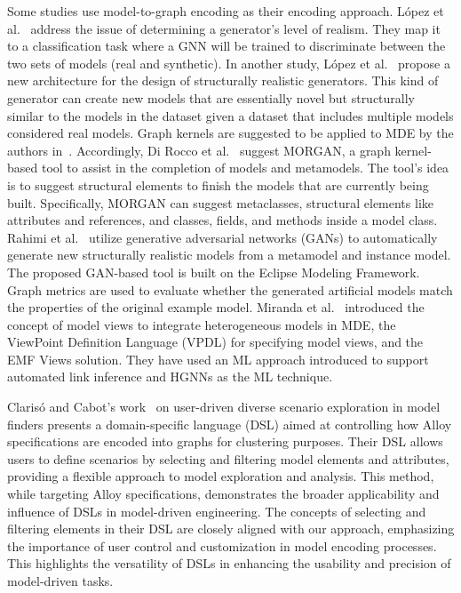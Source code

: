 \documentclass[journal,article,submit,moreauthors,technologies]{Definitions/mdpi}
\begin{document}
Some studies use model-to-graph encoding as their encoding approach. López et al.~\cite{lopez2021towards} address the issue of determining a generator's level of realism. They map it to a classification task where a GNN will be trained to discriminate between the two sets of models (real and synthetic). In another study, López et al.~\cite{lopez2022generating} propose a new architecture for the design of structurally realistic generators. This kind of generator can create new models that are essentially novel but structurally similar to the models in the dataset given a dataset that includes multiple models considered real models. Graph kernels are suggested to be applied to MDE by the authors in~\cite{clariso2018applying}. Accordingly, Di Rocco et al.~\cite{di2021gnn} suggest MORGAN, a graph kernel-based tool to assist in the completion of models and metamodels. The tool's idea is to suggest structural elements to finish the models that are currently being built. Specifically, MORGAN can suggest metaclasses, structural elements like attributes and references, and classes, fields, and methods inside a model class.
Rahimi et al.~\cite{rahimi2023towards} utilize generative adversarial networks (GANs) to automatically generate new structurally realistic models from a metamodel and instance model. The proposed GAN-based tool is built on the Eclipse Modeling Framework. Graph metrics are used to evaluate whether the generated artificial models match the properties of the original example model.
Miranda et al.~\cite{miranda2024towards} introduced the concept of model views to integrate heterogeneous models in MDE, the ViewPoint Definition Language (VPDL) for specifying model views, and the EMF Views solution. They have used an ML approach introduced to support automated link inference and HGNNs as the ML technique.

Clarisó and Cabot's work~\cite{clariso2022user} on user-driven diverse scenario exploration in model finders presents a domain-specific language (DSL) aimed at controlling how Alloy specifications are encoded into graphs for clustering purposes. Their DSL allows users to define scenarios by selecting and filtering model elements and attributes, providing a flexible approach to model exploration and analysis. This method, while targeting Alloy specifications, demonstrates the broader applicability and influence of DSLs in model-driven engineering. The concepts of selecting and filtering elements in their DSL are closely aligned with our approach, emphasizing the importance of user control and customization in model encoding processes. This highlights the versatility of DSLs in enhancing the usability and precision of model-driven tasks.
\end{document}
